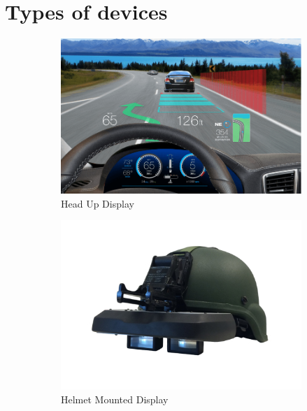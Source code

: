 \documentclass[12 pct]{report}
\begin{document}
\section{Types of devices}
\begin{figure}[h!]
  \centering
  \begin{subfigure}[b]{0.4\linewidth}
    \includegraphics[width=\linewidth]{head-up}
     \caption{Head Up Display}
  \end{subfigure}
  \begin{subfigure}[b]{0.4\linewidth}
    \includegraphics[width=\linewidth]{helmet-mounted}
    \caption{Helmet Mounted Display}
  \end{subfigure}
  \begin{subfigure}[b]{0.4\linewidth}

\end{subfigure}
\end{figure}
\end{document}

